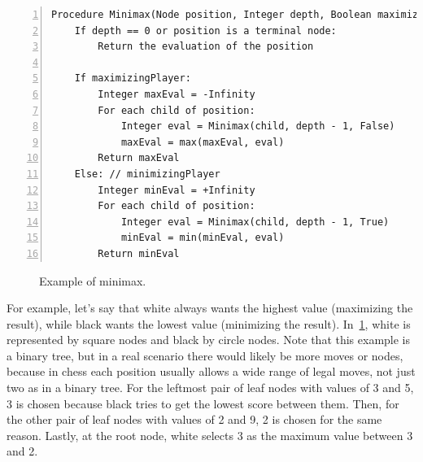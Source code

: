 \vspace{1em}

\begin{lstlisting}[caption={Pseudocode of the Minimax algorithm~\cite{Russell2021artificial}.}, label={lst:minimax}, frame=single, numbers=left, xleftmargin=15pt, breaklines=true]
Procedure Minimax(Node position, Integer depth, Boolean maximizingPlayer):
    If depth == 0 or position is a terminal node:
        Return the evaluation of the position

    If maximizingPlayer:
        Integer maxEval = -Infinity
        For each child of position:
            Integer eval = Minimax(child, depth - 1, False)
            maxEval = max(maxEval, eval)
        Return maxEval
    Else: // minimizingPlayer
        Integer minEval = +Infinity
        For each child of position:
            Integer eval = Minimax(child, depth - 1, True)
            minEval = min(minEval, eval)
        Return minEval
\end{lstlisting}

\begin{figure}[H]
    \centering
    \caption{Example of minimax.}\label{fig:minimax}
\end{figure}

\noindent For example, let's say that white always wants the highest value (maximizing the result), while black wants the lowest value (minimizing the result). In~\cref{fig:minimax}, white is represented by square nodes and black by circle nodes. Note that this example is a binary tree, but in a real scenario there would likely be more moves or nodes, because in chess each position usually allows a wide range of legal moves, not just two as in a binary tree. For the leftmost pair of leaf nodes with values of 3 and 5, 3 is chosen because black tries to get the lowest score between them. Then, for the other pair of leaf nodes with values of 2 and 9, 2 is chosen for the same reason. Lastly, at the root node, white selects 3 as the maximum value between 3 and 2.

